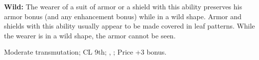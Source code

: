
\textbf{Wild:} The wearer of a suit of armor or a shield with this ability preserves his armor bonus (and any enhancement bonus) while in a wild shape. Armor and shields with this ability usually appear to be made covered in leaf patterns. While the wearer is in a wild shape, the armor cannot be seen.

Moderate transmutation; CL 9th; , ; Price +3 bonus. 
